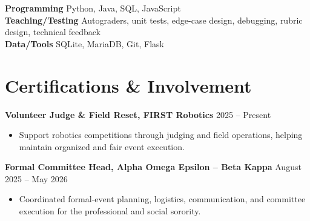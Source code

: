 \documentclass[letterpaper,10pt]{article}
\newcommand{\activityentry}[2]{
  \noindent\textbf{#1} \hfill #2
}
\begin{document}
\noindent\textbf{Programming} \quad Python, Java, SQL, JavaScript \\[1pt]
\noindent\textbf{Teaching/Testing} \quad Autograders, unit tests, edge-case design, debugging, rubric design, technical feedback \\[1pt]
\noindent\textbf{Data/Tools} \quad SQLite, MariaDB, Git, Flask

\section{Certifications \& Involvement}

\activityentry
  {Volunteer Judge \& Field Reset, FIRST Robotics}{2025 -- Present}
\begin{itemize}
  \item Support robotics competitions through judging and field operations, helping maintain organized and fair event execution.
\end{itemize}

\smallskip

\activityentry
  {Formal Committee Head, Alpha Omega Epsilon -- Beta Kappa}{August 2025 -- May 2026}
\begin{itemize}
  \item Coordinated formal-event planning, logistics, communication, and committee execution for the professional and social sorority.
\end{itemize}
\end{document}

